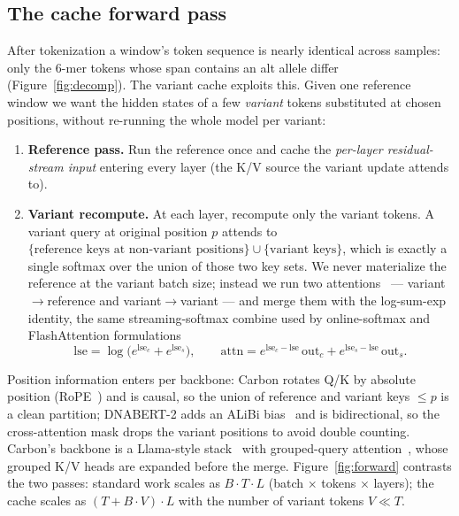 \documentclass[11pt]{article}
\begin{document}
\subsection{The cache forward pass}
After tokenization a window's token sequence is nearly identical across samples:
only the 6-mer tokens whose span contains an alt allele differ
(Figure~\ref{fig:decomp}). The variant cache exploits this. Given one reference
window we want the hidden states of a few \emph{variant} tokens substituted at
chosen positions, without re-running the whole model per variant:
\begin{enumerate}
  \item \textbf{Reference pass.} Run the reference once and cache the
  \emph{per-layer residual-stream input} entering every layer (the K/V source
  the variant update attends to).
  \item \textbf{Variant recompute.} At each layer, recompute only the variant
  tokens. A variant query at original position $p$ attends to
  $\{\text{reference keys at non-variant positions}\} \cup \{\text{variant keys}\}$,
  which is exactly a single softmax over the union of those two key sets. We
  never materialize the reference at the variant batch size; instead we run two
  attentions~\cite{vaswani2017attention} --- variant$\to$reference and
  variant$\to$variant --- and merge them with the log-sum-exp identity, the same
  streaming-softmax combine used by online-softmax and FlashAttention
  formulations~\cite{milakov2018online,dao2022flashattention}
  \[
    \mathrm{lse} = \log\!\big(e^{\mathrm{lse}_c} + e^{\mathrm{lse}_s}\big),\qquad
    \mathrm{attn} = e^{\mathrm{lse}_c-\mathrm{lse}}\,\mathrm{out}_c
                  + e^{\mathrm{lse}_s-\mathrm{lse}}\,\mathrm{out}_s .
  \]
\end{enumerate}
Position information enters per backbone: Carbon rotates Q/K by absolute position
(RoPE~\cite{su2021rope}) and is causal, so the union of reference and variant
keys $\le p$ is a clean partition; DNABERT-2 adds an ALiBi
bias~\cite{press2022alibi} and is bidirectional, so the cross-attention mask
drops the variant positions to avoid double counting. Carbon's backbone is a
Llama-style stack~\cite{touvron2023llama} with grouped-query
attention~\cite{ainslie2023gqa}, whose grouped K/V heads are expanded before the
merge.
Figure~\ref{fig:forward} contrasts the two passes: standard work scales as
$B\cdot T\cdot L$ (batch $\times$ tokens $\times$ layers); the cache scales as
$(T + B\cdot V)\cdot L$ with the number of variant tokens $V \ll T$.
\end{document}
